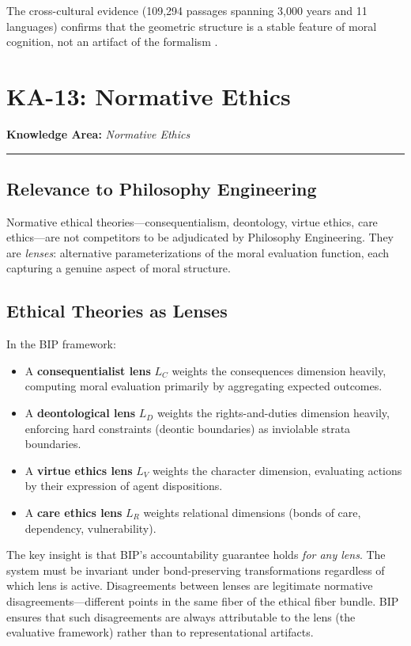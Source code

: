 \documentclass[12pt,letterpaper]{article}
\theoremstyle{definition}
\theoremstyle{plain}
\newcommand{\ka}[1]{\vspace{1em}\noindent\textbf{\large Knowledge Area:} \textit{#1}\vspace{0.5em}\hrule\vspace{0.5em}}
\begin{document}
The cross-cultural evidence (109,294 passages spanning 3,000 years and 11 languages) confirms that the geometric structure is a stable feature of moral cognition, not an artifact of the formalism \cite{bond2026geometric}.


\section{KA-13: Normative Ethics}
\label{sec:ka13}

\ka{Normative Ethics}

\subsection{Relevance to Philosophy Engineering}

Normative ethical theories---consequentialism, deontology, virtue ethics, care ethics---are not competitors to be adjudicated by Philosophy Engineering. They are \emph{lenses}: alternative parameterizations of the moral evaluation function, each capturing a genuine aspect of moral structure.

\subsection{Ethical Theories as Lenses}

In the BIP framework:
\begin{itemize}
    \item A \textbf{consequentialist lens} $L_C$ weights the consequences dimension heavily, computing moral evaluation primarily by aggregating expected outcomes.
    \item A \textbf{deontological lens} $L_D$ weights the rights-and-duties dimension heavily, enforcing hard constraints (deontic boundaries) as inviolable strata boundaries.
    \item A \textbf{virtue ethics lens} $L_V$ weights the character dimension, evaluating actions by their expression of agent dispositions.
    \item A \textbf{care ethics lens} $L_R$ weights relational dimensions (bonds of care, dependency, vulnerability).
\end{itemize}

The key insight is that BIP's accountability guarantee holds \emph{for any lens}. The system must be invariant under bond-preserving transformations regardless of which lens is active. Disagreements between lenses are legitimate normative disagreements---different points in the same fiber of the ethical fiber bundle. BIP ensures that such disagreements are always attributable to the lens (the evaluative framework) rather than to representational artifacts.
\end{document}
